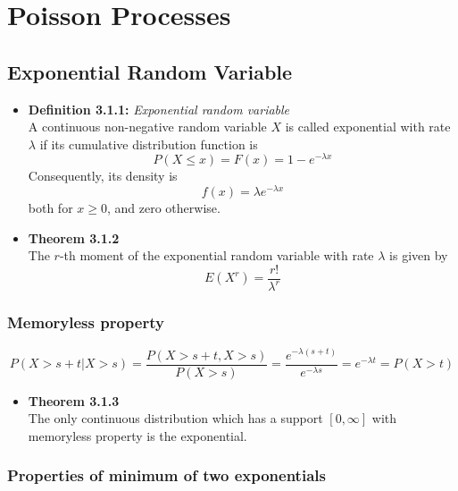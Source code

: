 \documentclass[11pt,a4paper]{article}
\begin{document}
\section{Poisson Processes}

\subsection{Exponential Random Variable}

\begin{itemize}

    \item \textbf{Definition 3.1.1:} \emph{Exponential random variable} \\
        A continuous non-negative random variable $X$ is called exponential with rate $\lambda$
        if its cumulative distribution function is
        \[
            P(X \leq x) = F(x) = 1 - e ^{-\lambda x}
        \]
        Consequently, its density is
        \[
            f(x) = \lambda e^{-\lambda x}
        \]
        both for $x \geq 0$, and zero otherwise.

    \item \textbf{Theorem 3.1.2} \\
        The $r$-th moment of the exponential random variable with rate $\lambda$ is given by
        \[
            E(X^r) = \frac{r!}{\lambda ^r}
        \]

\end{itemize}

\subsubsection{Memoryless property}

\[
    P(X>s+t|X>s) = \frac{P(X>s + t, X>s)}{P(X>s)} = \frac{e^{-\lambda (s+t)}}{e^{-\lambda s}}
    = e^{-\lambda t} = P(X>t)
\]

\begin{itemize}

    \item \textbf{Theorem 3.1.3} \\
        The only continuous distribution which has a support $[0,\infty]$
        with memoryless property is the exponential.

\end{itemize}

\subsubsection{Properties of minimum of two exponentials}
\end{document}
